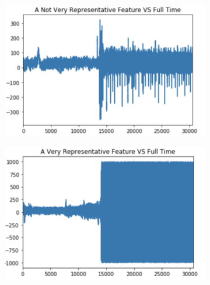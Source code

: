 \documentclass{article}
\begin{document}
\begin{figure}
  \begin{subfigure}[b]{0.5\textwidth}
    \includegraphics[width=\textwidth]{norepr}
    \label{fig:1}
  \end{subfigure}
  \begin{subfigure}[b]{0.5\textwidth}
    \includegraphics[width=\textwidth]{repr}
    \label{fig:2}
  \end{subfigure}
\end{figure}
\end{document}
